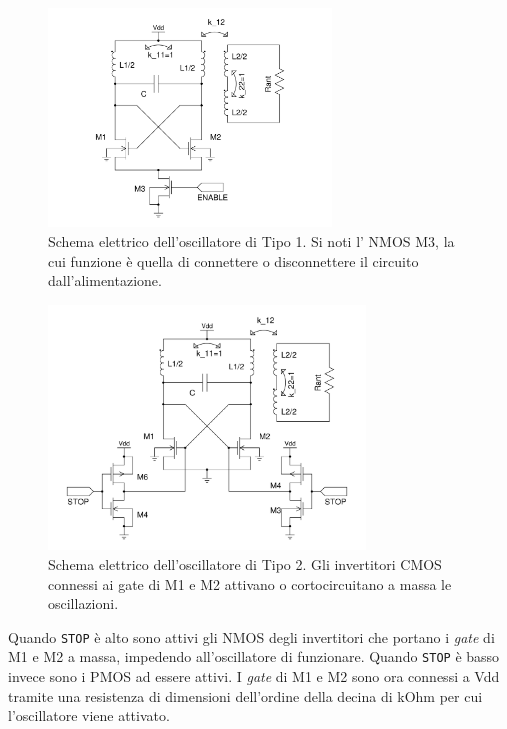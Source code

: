 \documentclass[a4paper, 12pt]{memoir}
\begin{document}
\begin{figure}[h]
\centering
\includegraphics[width=0.67\textwidth]{images/tipo1.pdf}
\caption{Schema elettrico dell'oscillatore di Tipo 1. Si noti l' NMOS M3, la
      cui funzione è quella di connettere o disconnettere il circuito
	dall'alimentazione.}
\end{figure}
\begin{figure}[h]
\centering
\includegraphics[width=0.75\textwidth]{images/tipo2.pdf}
\caption{Schema elettrico dell'oscillatore di Tipo 2. Gli invertitori CMOS
      connessi ai gate di M1 e M2 attivano o cortocircuitano a massa le
      oscillazioni.}
\end{figure}
\clearpage %

\noindent Quando \texttt{STOP} è alto sono attivi gli NMOS degli invertitori
che portano i \emph{gate} di M1 e M2 a massa, impedendo all'oscillatore di 
funzionare. Quando \texttt{STOP} è basso invece sono i PMOS ad essere attivi. I 
\emph{gate} di M1 e M2 sono ora connessi a Vdd tramite una resistenza di 
dimensioni dell'ordine della decina di kOhm per cui l'oscillatore viene 
attivato.
\end{document}
